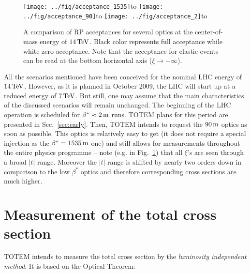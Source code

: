 \documentclass{cimento}
\def\be{\beta}
\def\un#1{\,{\rm #1}}
\def\abtitle#1#2{\vbox{\setbox0\hbox{#1}\hbox to\wd0{\hss#2\hss}\copy0}}
\begin{document}
\begin{figure}[htb]
\centerline{\hss\hskip-1.5mm
	\abtitle{\texttt{[image: ../fig/acceptance\_1535]}}{\qquad\quad$\be^* = 1535\un{m}$}\hfil
	\abtitle{\texttt{[image: ../fig/acceptance\_90]}}{$\qquad\quad\be^* = 90\un{m}$}\hfil
	\abtitle{\texttt{[image: ../fig/acceptance\_2]}}{$\qquad\quad\be^* = 2\un{m}$}\hss
}%
\caption{A comparison of RP acceptances for several optics at the center-of-mass energy of $14\un{TeV}$. Black color represents full acceptance while white zero acceptance. Note that the acceptance for elastic events can be read at the bottom horizontal axis ($\xi\to -\infty$).}%
\label{fig:acceptances}%
\end{figure}

All the scenarios mentioned have been conceived for the nominal LHC energy of $14\un{TeV}$. However, as it is planned in October 2009, the LHC will start up at a reduced energy of $7\un{TeV}$.%
But still, one may assume that the main characteristics of the discussed scenarios will remain unchanged. The beginning of the LHC operation is scheduled for $\be^*\approx 2\un{m}$ runs. TOTEM plans for this period are presented in Sec.~\ref{sec:early}. Then, TOTEM intends to request the $90\un{m}$ optics as soon as possible. This optics is relatively easy to get (it does not require a special injection as the $\be^*=1535\un{m}$ one) and still allows for measurements throughout the entire physics programme -- note (e.g. in Fig.~\ref{fig:acceptances}) that all $\xi$'s are seen through a broad $|t|$ range. Moreover the $|t|$ range is shifted by nearly two orders down in comparison to the low $\be^*$ optics and therefore corresponding cross sections are much higher.



\section{Measurement of the total cross section}
\label{sec:tot meas}

TOTEM intends to measure the total cross section by the {\em luminosity independent method}. It is based on the Optical Theorem:
\end{document}
